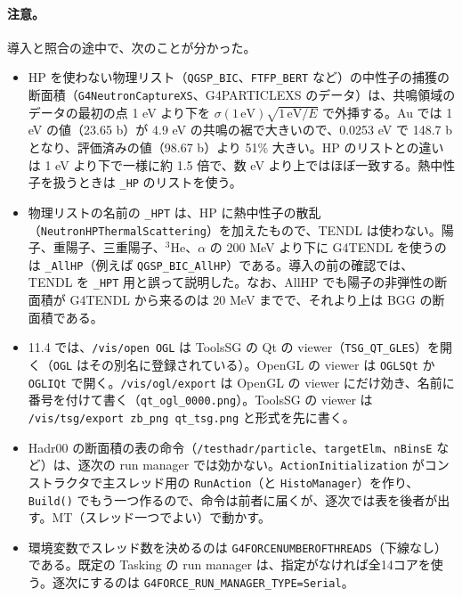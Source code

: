 \documentclass[a4paper,10pt]{ltjsarticle}
\begin{document}
\paragraph{注意。}導入と照合の途中で、次のことが分かった。
\begin{itemize}
\item HP を使わない物理リスト（\texttt{QGSP\_BIC}、\texttt{FTFP\_BERT} など）の中性子の捕獲の断面積（\texttt{G4NeutronCaptureXS}、G4PARTICLEXS のデータ）は、共鳴領域のデータの最初の点 1 eV より下を $\sigma(1\,\mathrm{eV})\sqrt{1\,\mathrm{eV}/E}$ で外挿する。Au では 1 eV の値（23.65 b）が 4.9 eV の共鳴の裾で大きいので、0.0253 eV で 148.7 b となり、評価済みの値（98.67 b）より 51\% 大きい。HP のリストとの違いは 1 eV より下で一様に約 1.5 倍で、数 eV より上ではほぼ一致する。熱中性子を扱うときは \texttt{\_HP} のリストを使う。
\item 物理リストの名前の \texttt{\_HPT} は、HP に熱中性子の散乱（\texttt{NeutronHPThermalScattering}）を加えたもので、TENDL は使わない。陽子、重陽子、三重陽子、$^3$He、$\alpha$ の 200 MeV より下に G4TENDL を使うのは \texttt{\_AllHP}（例えば \texttt{QGSP\_BIC\_AllHP}）である。導入の前の確認では、TENDL を \texttt{\_HPT} 用と誤って説明した。なお、AllHP でも陽子の非弾性の断面積が G4TENDL から来るのは 20 MeV までで、それより上は BGG の断面積である。
\item 11.4 では、\texttt{/vis/open OGL} は ToolsSG の Qt の viewer（\texttt{TSG\_QT\_GLES}）を開く（\texttt{OGL} はその別名に登録されている）。OpenGL の viewer は \texttt{OGLSQt} か \texttt{OGLIQt} で開く。\texttt{/vis/ogl/export} は OpenGL の viewer にだけ効き、名前に番号を付けて書く（\texttt{qt\_ogl\_0000.png}）。ToolsSG の viewer は \texttt{/vis/tsg/export zb\_png qt\_tsg.png} と形式を先に書く。
\item Hadr00 の断面積の表の命令（\texttt{/testhadr/particle}、\texttt{targetElm}、\texttt{nBinsE} など）は、逐次の run manager では効かない。\texttt{ActionInitialization} がコンストラクタで主スレッド用の \texttt{RunAction}（と \texttt{HistoManager}）を作り、\texttt{Build()} でもう一つ作るので、命令は前者に届くが、逐次では表を後者が出す。MT（スレッド一つでよい）で動かす。
\item 環境変数でスレッド数を決めるのは \texttt{G4FORCENUMBEROFTHREADS}（下線なし）である。既定の Tasking の run manager は、指定がなければ全14コアを使う。逐次にするのは \texttt{G4FORCE\_RUN\_MANAGER\_TYPE=Serial}。

\end{itemize}
\end{document}
